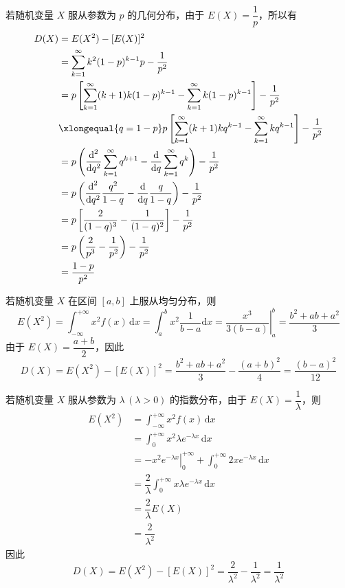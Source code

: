若随机变量 $X$ 服从参数为 $p$ 的几何分布，由于 $E(X) = \dfrac{1}{p}$，所以有
$$
\begin{aligned}
    D(X) &= E(X^2) - [E(X)]^2 \\
    &= \sum_{k=1}^{\infty} k^2 (1-p)^{k-1} p - \dfrac{1}{p^2} \\
    &= p \left[ \sum_{k=1}^{\infty} (k+1)k (1-p)^{k-1} - \sum_{k=1}^{\infty} k (1-p)^{k-1} \right] - \dfrac{1}{p^2} \\
    & \xlongequal{q=1-p} p \left[ \sum_{k=1}^{\infty} (k+1)k q^{k-1} - \sum_{k=1}^{\infty} k q^{k-1} \right] - \dfrac{1}{p^2} \\
    &= p \left( \dfrac{\text{d}^2}{\text{d}q^2} \sum_{k=1}^{\infty} q^{k+1} - \dfrac{\text{d}}{\text{d}q} \sum_{k=1}^{\infty} q^k \right) - \dfrac{1}{p^2} \\
    &= p \left( \dfrac{\text{d}^2}{\text{d}q^2} \dfrac{q^2}{1-q} - \dfrac{\text{d}}{\text{d}q} \dfrac{q}{1-q} \right) - \dfrac{1}{p^2} \\
    &= p \left[ \dfrac{2}{(1-q)^3} - \dfrac{1}{(1-q)^2} \right] - \dfrac{1}{p^2} \\
    &= p \left( \dfrac{2}{p^3} - \dfrac{1}{p^2} \right) - \dfrac{1}{p^2} \\
    &= \dfrac{1-p}{p^2}
\end{aligned}
$$

若随机变量 $X$ 在区间 $[a,b]$ 上服从均匀分布，则
$$
E(X^2) = \int_{-\infty}^{+\infty} x^2 f(x) \, \text{d}x = \int_a^b x^2 \dfrac{1}{b-a} \text{d}x = \left. \dfrac{x^3}{3(b-a)} \right|_a^b = \dfrac{b^2 + ab + a^2}{3}
$$
由于 $E(X) = \dfrac{a+b}{2}$，因此
$$
D(X) = E(X^2) - [E(X)]^2 = \dfrac{b^2 + ab + a^2}{3} - \dfrac{(a+b)^2}{4} = \dfrac{(b-a)^2}{12}
$$

若随机变量 $X$ 服从参数为 $\lambda \, (\lambda > 0)$ 的指数分布，由于 $E(X) = \dfrac{1}{\lambda}$，则
$$
\begin{aligned}
    E(X^2) &= \int_{-\infty}^{+\infty} x^2 f(x) \, \text{d}x \\
    &= \int_0^{+\infty} x^2 \lambda e^{-\lambda x} \, \text{d}x \\
    &= \left. -x^2 e^{-\lambda x} \right|_0^{+\infty} + \int_0^{+\infty} 2x e^{-\lambda x} \, \text{d}x \\
    &= \dfrac{2}{\lambda} \int_0^{+\infty} x \lambda e^{-\lambda x} \, \text{d}x \\
    &= \dfrac{2}{\lambda} E(X) \\
    &= \dfrac{2}{\lambda^2}
\end{aligned}
$$
因此
$$
D(X) = E(X^2) - [E(X)]^2 = \dfrac{2}{\lambda^2} - \dfrac{1}{\lambda^2} = \dfrac{1}{\lambda^2}
$$

